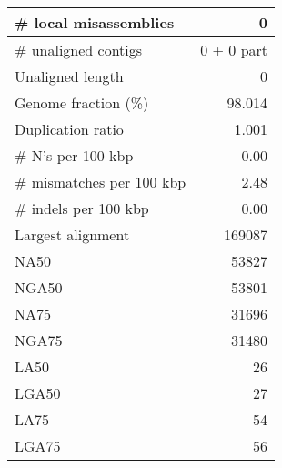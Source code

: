\documentclass[12pt,a4paper]{article}
\begin{document}
\begin{table}[ht]
\begin{center}
\begin{tabular}{|l*{1}{|r}|}
\# local misassemblies & 0 \\ \hline
\# unaligned contigs & 0 + 0 part \\ \hline
Unaligned length & 0 \\ \hline
Genome fraction (\%) & 98.014 \\ \hline
Duplication ratio & 1.001 \\ \hline
\# N's per 100 kbp & 0.00 \\ \hline
\# mismatches per 100 kbp & 2.48 \\ \hline
\# indels per 100 kbp & 0.00 \\ \hline
Largest alignment & 169087 \\ \hline
NA50 & 53827 \\ \hline
NGA50 & 53801 \\ \hline
NA75 & 31696 \\ \hline
NGA75 & 31480 \\ \hline
LA50 & 26 \\ \hline
LGA50 & 27 \\ \hline
LA75 & 54 \\ \hline
LGA75 & 56 \\ \hline
\end{tabular}
\end{center}
\end{table}
\end{document}
